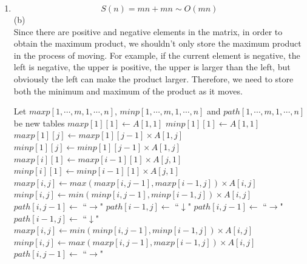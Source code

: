 \documentclass[12pt,a4paper]{article}
\makeatletter
\newtheorem*{solution}{Solution}
\theoremstyle{definition}
\renewenvironment{solution}[1][Solution] {\par\pushQED{\qed}\normalfont\topsep6\p@\@plus6\p@\relax\trivlist\item[\hskip\labelsep\bfseries#1\@addpunct{.}]\ignorespaces}{\popQED\endtrivlist\@endpefalse} \makeatother
\makeatother
\begin{document}
\begin{enumerate}
\begin{solution}
        	\[
        	S(n) = mn + mn \sim O(mn)
        	\]
        	\newpage
        	(b) \\
        	Since there are positive and negative elements in the matrix, in order to obtain the maximum product, we shouldn't only store the maximum product in the process of moving. For example, if the current element is negative, the left is negative, the upper is positive, the upper is larger than the left, but obviously the left can make the product larger. Therefore, we need to store both the minimum and maximum of the product as it moves.
        	 \begin{algorithm}[H]
        	 	\BlankLine
        	 	\caption{$optPath(A_{m\times n})$} \label{Alg-div}
        	 	Let $maxp[1,\cdots,m,1,\cdots,n]$, $minp[1,\cdots,m,1,\cdots,n]$ and $path[1,\cdots,m,1,\cdots,n]$ be new tables\;
        	 	$maxp[1][1]\leftarrow A[1,1]$\; 
        	 	$minp[1][1]\leftarrow A[1,1]$\; 
        	 	{
        	 		$maxp[1][j] \leftarrow maxp[1][j-1]\times A[1,j]$\;
        	 		$minp[1][j] \leftarrow minp[1][j-1]\times A[1,j]$\;  
        	 	}
        	 	{
        	 		$maxp[i][1] \leftarrow maxp[i-1][1]\times A[j,1]$\;  
        	 		$minp[i][1] \leftarrow minp[i-1][1]\times A[j,1]$\;  
        	 	}
        	 	{
        	 		{
        	 			{
        	 				$maxp[i,j] \leftarrow max(maxp[i,j-1],maxp[i-1,j]) \times A[i,j]$\;
        	 				$minp[i,j] \leftarrow min(minp[i,j-1],minp[i-1,j]) \times A[i,j]$\;
        	 				{
        	 					$path[i, j-1] \leftarrow$ ``$\rightarrow$"\; 
        	 				}
        	 				{
        	 					$path[i-1, j] \leftarrow$ ``$\downarrow$"\; 
        	 				}
        	 				\Else
        	 				{
        	 					$path[i, j-1] \leftarrow$ ``$\rightarrow$"\; 
        	 					$path[i-1, j] \leftarrow$ ``$\downarrow$"\; 
        	 				}
        	 			}
         				\Else
         				{
         					$maxp[i,j] \leftarrow min(minp[i,j-1],minp[i-1,j]) \times A[i,j]$\;
         					$minp[i,j] \leftarrow max(maxp[i,j-1],maxp[i-1,j]) \times A[i,j]$\;
         					{
         						$path[i, j-1] \leftarrow$ ``$\rightarrow$"\; 
         					}
}}}
\end{algorithm}
\end{solution}
\end{enumerate}
\end{document}
